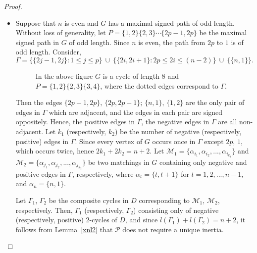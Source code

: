 \documentclass[a4paper, 10pt]{article}
\numberwithin{equation}{section}
\begin{document}
\begin{proof}
\begin{itemize}
		\item[iii.] Suppose that $n$ is even and $G$ has a maximal signed path of odd length. Without loss of generality, let $P=\{1,2\}\{2,3\}\cdots\{2p-1,2p\}$ be the maximal signed path in $G$ of odd length. Since $n$ is even, the path from $2p$ to $1$ is of odd length.
		Consider,
		$$\Gamma=\{\{2j-1,2j\}: 1\leq j \leq p\}~\cup~\{\{2i,2i+1\}:2p\leq 2i\leq (n-2)\}~\cup~\{\{n,1\}\}. $$ 
		\begin{figure}[H]
			\tikzset{node distance=1cm}
			\centering
			\caption{ In the above figure $G$ is a cycle of length $8$ and $P=\{1,2\}\{2,3\}\{3,4\}$, where the dotted edges correspond to $\Gamma$.} \end{figure}
		Then the edges $\{2p-1,2p\}$, $\{2p,2p+1\}$; $\{n,1\}$, $\{1,2\}$ are the only pair of edges in $\Gamma$ which are adjacent, and the edges in each pair are signed oppositely. Hence, the positive edges in $\Gamma$, the negative edges in $\Gamma$ are all non-adjacent. Let $k_1$ (respectively, $k_2$) be the number of negative (respectively, positive) edges in $\Gamma$. Since every vertex of $G$ occurs once in $\Gamma$ except $2p$, $1$, which occurs twice, hence $2k_1+2k_2=n+2$. 
		Let $\mathcal{M}_1=\{\alpha_{i_1},\alpha_{i_2},..., \alpha_{i_{k_1}}\}$ and $\mathcal{M}_2=\{\alpha_{j_1},\alpha_{j_2},..., \alpha_{j_{k_2}}\}$ be two matchings in $G$ containing only negative and positive edges in $\Gamma$, respectively, where $\alpha_t=\{t,t+1\}$ for $t=1,2,...,n-1$, and $\alpha_n=\{n,1\}$. 
		
		Let $\Gamma_1$, $\Gamma_2$ be the composite cycles in $D$ corresponding to $\mathcal{M}_1$, $\mathcal{M}_2$, respectively. Then, $\Gamma_1$ (respectively, $\Gamma_2$) consisting only of negative (respectively, positive) $2$-cycles of $D$, and since $l(\Gamma_1) + l(\Gamma_2) = n + 2$, it follows from Lemma~\ref{xnl2} that $\mathcal{P}$ does not require a unique inertia. 
	\end{itemize} 
\end{proof}
\end{document}
